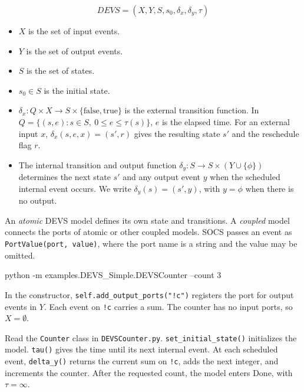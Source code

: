 \documentclass[11pt,a4paper]{article}
\newcommand{\api}[1]{\texttt{#1}}
\newcommand{\chaptermark}[1]{\par\noindent{\LARGE\color{ink}\bfseries #1}\par\smallskip}
\newcommand{\topic}[1]{\par\medskip{\large\color{accent}\bfseries #1}\par}
\begin{document}
\begin{equation}
DEVS=(X, Y, S, s_0, \delta_x, \delta_y, \tau)
\label{eq:devs}
\end{equation}
\begin{itemize}
	\item $X$ is the set of input events.
	\item $Y$ is the set of output events.
	\item $S$ is the set of states.
	\item $s_0 \in S$ is the initial state.
  \item $\delta_x\colon Q\times X\to S\times\{\mathrm{false},\mathrm{true}\}$ is the external transition function. In $Q=\{(s,e):s\in S,\ 0\le e\le\tau(s)\}$, $e$ is the elapsed time. For an external input $x$, $\delta_x(s,e,x)=(s',r)$ gives the resulting state $s'$ and the reschedule flag $r$.
  \item The internal transition and output function $\delta_y\colon S\to S\times (Y\cup\{\phi\})$ determines the next state $s'$ and any output event $y$ when the scheduled internal event occurs. We write $\delta_y(s)=(s',y)$, with $y=\phi$ when there is no output.
\end{itemize}
\newpage
\chaptermark{2.1 \enspace DEVS}

An \emph{atomic} DEVS model defines its own state and transitions. A
\emph{coupled} model connects the ports of atomic or other coupled
models. SOCS passes an event as \api{PortValue(port, value)}, where
the port name is a string and the value may be omitted.

\topic{2.1.1 \enspace DEVSCounter}
\begin{Code}
python -m examples.DEVS_Simple.DEVSCounter --count 3
\end{Code}
In the constructor, \api{self.add\_output\_ports("!c")} registers the
port for output events in \(Y\). Each event on \api{!c} carries a sum.
The counter has no input ports, so $X=\emptyset$.

Read the \api{Counter} class in \api{DEVSCounter.py}. \api{set\_initial\_state()}
initializes the model. \api{tau()} gives the time until its next internal
event. At each scheduled event, \api{delta\_y()} returns the current sum
on \api{!c}, adds the next integer, and increments the counter. After
the requested count, the model enters Done, with $\tau=\infty$.
\end{document}
